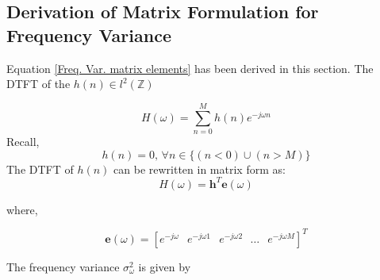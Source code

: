 \begin{appendix}
\appendixpage
\chapter{}
\pagestyle{empty}
\section{Derivation of Matrix Formulation for Frequency Variance}
\label{appendix-1}

Equation \ref{Freq. Var. matrix elements} has been derived in this section. The DTFT of the $h(n) \in l^2(\mathbb{Z})$  

\begin{equation}
H(\omega)=\sum^{M}_{n=0}h(n) e^{-j\omega n}
\end{equation}
Recall,
\begin{equation*}
h(n)=0 ,\, \forall n \in \{ (n < 0) \cup (n > M)\}
\end{equation*}
The DTFT of $h(n)$ can be rewritten in matrix form as:
\begin{equation}
H(\omega)=\mathbf{h}^{T}\mathbf{e}(\omega)
\end{equation}

where,

\begin{equation}
\mathbf{e}(\omega)=[e^{-j\omega}\,\,\,\ e^{-j\omega 1}\,\,\,\ e^{-j\omega 2}\,\,\,\,\ldots\,\,\,\ e^{-j\omega M}]^T
\end{equation}

The frequency variance $\sigma_{\omega}^{2}$ is given by


\end{appendix}
